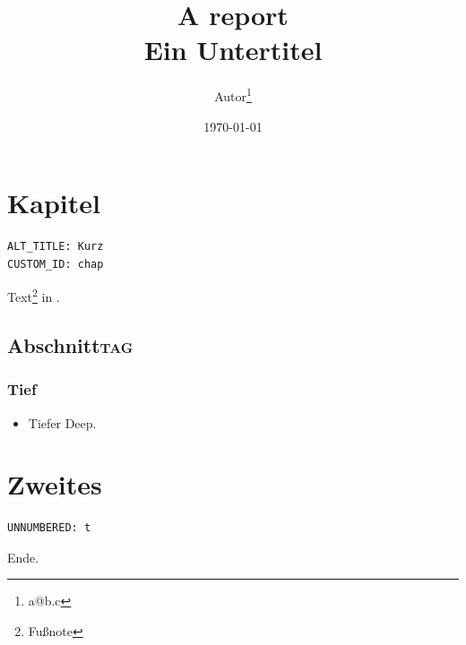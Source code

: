 \documentclass[a4paper,12pt]{report}
\author{Autor\thanks{a@b.c}}
\date{\today}
\title{A report\\\medskip
\large Ein Untertitel}
\begin{document}
\maketitle
\setcounter{tocdepth}{2}
\tableofcontents

\part[Kurz]{Kapitel}
\label{sec:org1c59b52}
\begin{verbatim}
ALT_TITLE: Kurz
CUSTOM_ID: chap
\end{verbatim}
Text\footnote{Fußnote} in \ref{sec:org1c59b52}.
\chapter{Abschnitt\hfill{}\textsc{tag}}
\label{sec:org1f85fd9}
\section*{Tief}
\label{sec:org47118c0}
\begin{itemize}
\item Tiefer
\label{sec:orgaf3ed89}
Deep.
\end{itemize}
\part*{Zweites}
\label{sec:org0e4d337}
\begin{verbatim}
UNNUMBERED: t
\end{verbatim}
Ende.
\end{document}
